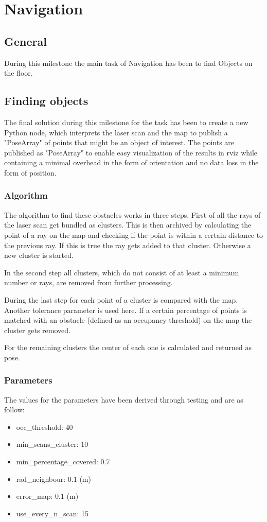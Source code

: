 \documentclass[main.tex]{subfiles}
\begin{document}
	
	\chapter{Navigation}
		\section{General}
		During this milestone the main task of Navigation has been to find Objects on the floor.
		
		\section{Finding objects}
		The final solution during this milestone for the task has been to create a new Python node, which interprets the laser scan and the map to publish a "PoseArray" of points that might be an object of interest. The points are published as "PoseArray" to enable easy visualization of the results in rviz while containing a minimal overhead in the form of orientation and no data loss in the form of position.
		
		\subsection{Algorithm}
		The algorithm to find these obstacles works in three steps. First of all the rays of the laser scan get bundled as clusters. This is then archived by calculating the point of a ray on the map and checking if the point is within a certain distance to the previous ray. If this is true the ray gets added to that cluster. Otherwise a new cluster is started.
		
		In the second step all clusters, which do not consist of at least a minimum number or rays, are removed from further processing.
		
		During the last step for each point of a cluster is compared with the map. Another tolerance parameter is used here. If a certain percentage of points is matched with an obstacle (defined as an occupancy threshold) on the map the cluster gets removed.
		
		For the remaining clusters the center of each one is calculated and returned as pose.
		
		\subsection{Parameters}
		The values for the parameters have been derived through testing and are as follow:
		\begin{itemize}
			\item occ\_threshold: 40 
			\item min\_scans\_cluster: 10
			\item min\_percentage\_covered: 0.7
			\item rad\_neighbour: 0.1 (m)
			\item error\_map: 0.1 (m)
			\item use\_every\_n\_scan: 15
		\end{itemize}
		
\end{document}
